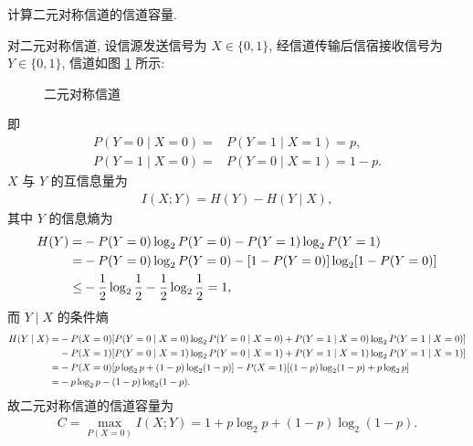 \documentclass{assignment}
\begin{document}
\begin{prob}
    计算二元对称信道的信道容量.
\end{prob}
\begin{sol}
    对二元对称信道, 设信源发送信号为 $X\in\{0,1\}$, 经信道传输后信宿接收信号为 $Y\in\{0,1\}$, 信道如图 \ref{1-info channel} 所示:

    \begin{figure}[H]
        \centering
        \caption{二元对称信道}
        \label{1-info channel}
    \end{figure}

    即
    \begin{align}
        P(Y=0\mid X=0)=&P(Y=1\mid X=1)=p,\\
        P(Y=1\mid X=0)=&P(Y=0\mid X=1)=1-p.
    \end{align}
    $X$ 与 $Y$ 的互信息量为
    \begin{align}
        I(X;Y)=H(Y)-H(Y\mid X),
    \end{align}
    其中 $Y$ 的信息熵为
    \begin{align}
        \notag H(Y)=&-P(Y=0)\log_2P(Y=0)-P(Y=1)\log_2P(Y=1)\\
        \notag=&-P(Y=0)\log_2P(Y=0)-[1-P(Y=0)]\log_2[1-P(Y=0)]\\
        \leq&-\frac{1}{2}\log_2\frac{1}{2}-\frac{1}{2}\log_2\frac{1}{2}=1,
    \end{align}
    而 $Y\mid X$ 的条件熵
    \begin{align}
        \notag H(Y\mid X)=&-P(X=0)[P(Y=0\mid X=0)\log_2P(Y=0\mid X=0)+P(Y=1\mid X=0)\log_2P(Y=1\mid X=0)]\\
        \notag&-P(X=1)[P(Y=0\mid X=1)\log_2P(Y=0\mid X=1)+P(Y=1\mid X=1)\log_2P(Y=1\mid X=1)]\\
        \notag=&-P(X=0)[p\log_2p+(1-p)\log_2(1-p)]-P(X=1)[(1-p)\log_2(1-p)+p\log_2p]\\
        =&-p\log_2p-(1-p)\log_2(1-p).
    \end{align}
    故二元对称信道的信道容量为
    \begin{align}
        C=\max_{P(X=0)}I(X;Y)=1+p\log_2p+(1-p)\log_2(1-p).
    \end{align}
\end{sol}
\end{document}
